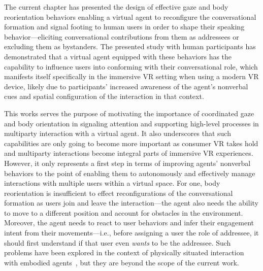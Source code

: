 The current chapter has presented the design of effective gaze and body reorientation behaviors enabling a virtual agent to reconfigure the conversational formation and signal footing to human users in order to shape their speaking behavior---eliciting conversational contributions from them as addressees or excluding them as bystanders. The presented study with human participants has demonstrated that a virtual agent equipped with these behaviors has the capability to influence users into conforming with their conversational role, which manifests itself specifically in the immersive VR setting when using a modern VR device, likely due to participants' increased awareness of the agent's nonverbal cues and spatial configuration of the interaction in that context.

This works serves the purpose of motivating the importance of coordinated gaze and body orientation in signaling attention and supporting high-level processes in multiparty interaction with a virtual agent. It also underscores that such capabilities are only going to become more important as consumer VR takes hold and multiparty interactions become integral parts of immersive VR experiences. However, it only represents a first step in terms of improving agents' nonverbal behaviors to the point of enabling them to autonomously and effectively manage interactions with multiple users within a virtual space. For one, body reorientation is insufficient to effect reconfigurations of the conversational formation as users join and leave the interaction---the agent also needs the ability to move to a different position and account for obstacles in the environment. Moreover, the agent needs to react to user behaviors and infer their engagement intent from their movements---i.e., before assigning a user the role of addressee, it should first understand if that user even \emph{wants} to be the addressee. Such problems have been explored in the context of physically situated interaction with embodied agents~\citep{bohus2009models}, but they are beyond the scope of the current work. 